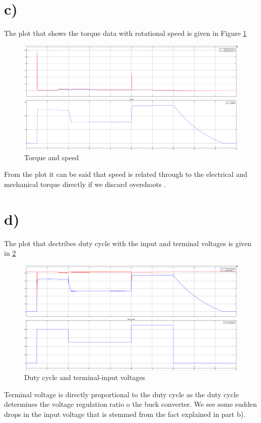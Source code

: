 \documentclass[letterpaper,12pt]{article}
\begin{document}
\section{c)}
The plot that shows the torque data with rotational speed is given in Figure \ref{torques}
\begin{figure}[H]
    \centering
    \includegraphics[width=1\textwidth]{case1_2_torque_speed.png}
    \caption{Torque and speed}
    \label{torques}
\end{figure} 
From the plot it can be said that speed is related through to the electrical and mechanical torque directly if we discard overshoots . 
\section{d)}
The plot that dectribes duty cycle with the input and terminal voltages is given in \ref{voltages}
\begin{figure}[H]
    \centering
    \includegraphics[width=1\textwidth]{case1_2_inputvoltage_terminalvoltage_dutycycle.png}
    \caption{Duty cycle and terminal-input voltages}
    \label{voltages}
\end{figure} 
Terminal voltage is directly proportional to the duty cycle as the duty cycle determines the voltage regulation ratio o the buck converter. We see some sudden drops in the input voltage that is stemmed from the fact explained in part b).
\end{document}
